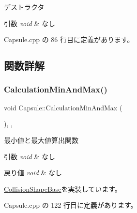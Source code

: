 デストラクタ 


\begin{DoxyParams}{引数}
{\em void} & なし \\
\hline
\end{DoxyParams}


 Capsule.\+cpp の 86 行目に定義があります。



\subsection{関数詳解}
\mbox{\label{class_capsule_a52ada68cdb0c18a4dd8b4b169ad0d6df}} 
\subsubsection{\texorpdfstring{Calculation\+Min\+And\+Max()}{CalculationMinAndMax()}}
{\footnotesize\ttfamily void Capsule\+::\+Calculation\+Min\+And\+Max (\begin{DoxyParamCaption}{ }\end{DoxyParamCaption})\hspace{0.3cm}{\ttfamily [override]}, {\ttfamily [private]}, {\ttfamily [virtual]}}



最小値と最大値算出関数 


\begin{DoxyParams}{引数}
{\em void} & なし \\
\hline
\end{DoxyParams}

\begin{DoxyRetVals}{戻り値}
{\em void} & なし \\
\hline
\end{DoxyRetVals}


\mbox{\hyperlink{class_collision_shape_base_ad227c2f83038d7c05bc6b1d510cb4000}{Collision\+Shape\+Base}}を実装しています。



 Capsule.\+cpp の 122 行目に定義があります。

\mbox{\label{class_capsule_a32991dc5e0331f716302ce73a8f9fd2f}} 
